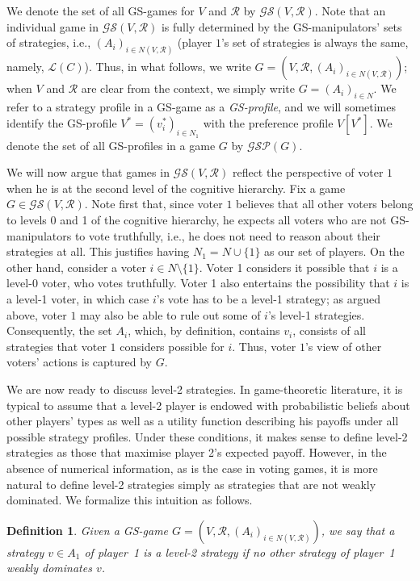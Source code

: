 \documentclass[11pt]{article}
\newtheorem{definition}{Definition}
\newcommand{\calR}{\mathcal{R}}
\newcommand{\calL}{\mathcal{L}}
\newcommand{\GS}{\mathcal{GS}}
\newcommand{\GSP}{\mathcal{GSP}}
\begin{document}
We denote the set of all GS-games for $V$ and $\calR$ by $\GS(V, \calR)$.
Note that an individual game in $\GS(V, \calR)$ is fully determined by the 
GS-manipulators' sets of strategies, i.e.,
$(A_i)_{i\in N(V, \calR)}$ (player $1$'s set of strategies is always the same, namely, $\calL(C)$). 
Thus, in what follows, we write $G=(V, \calR, (A_i)_{i\in N(V, \calR)})$;
when $V$ and $\calR$ are clear from the context, we simply write $G = (A_i)_{i\in N}$.
We refer to a strategy profile in a GS-game as a {\em GS-profile},
and we will sometimes identify the GS-profile $V^* = (v^*_i)_{i\in N_1}$ with the preference profile
$V[V^*]$. We denote the set of all GS-profiles in a game $G$ by $\GSP(G)$. 

We will now argue that games in $\GS(V, \calR)$ reflect the perspective of voter $1$
when he is at the second level of the cognitive hierarchy. Fix a game $G\in\GS(V, \calR)$.
Note first that, since voter $1$ believes that all other voters belong
to levels 0 and 1 of the cognitive hierarchy, 
he expects all voters who are not GS-manipulators to vote truthfully, i.e., he does
not need to reason about their strategies at all. This justifies having $N_1 = N\cup\{1\}$ as our set of players.
On the other hand, consider a voter $i\in N\setminus\{1\}$. Voter 1 considers it possible
that $i$ is a level-0 voter, who votes truthfully. Voter 1 also entertains
the possibility that $i$ is a level-1 voter, in which case $i$'s vote
has to be a level-1 strategy; as argued above, voter $1$ may also be able to rule
out some of $i$'s level-1 strategies. Consequently, the set $A_i$, which, by definition, contains
$v_i$, consists of all strategies that voter $1$ considers possible for $i$.
Thus, voter $1$'s view of other voters' actions is captured by $G$.

We are now ready to discuss level-2 strategies.
In game-theoretic literature, it is typical to assume that a level-2 player is endowed with probabilistic
beliefs about other players' types as well as a utility function describing his payoffs under all
possible strategy profiles. Under these conditions, it makes sense to define level-2 strategies
as those that maximise player 2's expected payoff. However, in the absence of numerical information, 
as is the case in voting games, it is more natural to define level-2 strategies simply as 
strategies that are not weakly dominated. We formalize this intuition as follows.

\begin{definition}
Given a GS-game $G=(V, \calR, (A_i)_{i\in N(V, \calR)})$, we say that a strategy $v\in A_1$ of player~1
is a {\em level-2 strategy} if no other strategy of player~1 weakly dominates $v$.
\end{definition}
\end{document}
